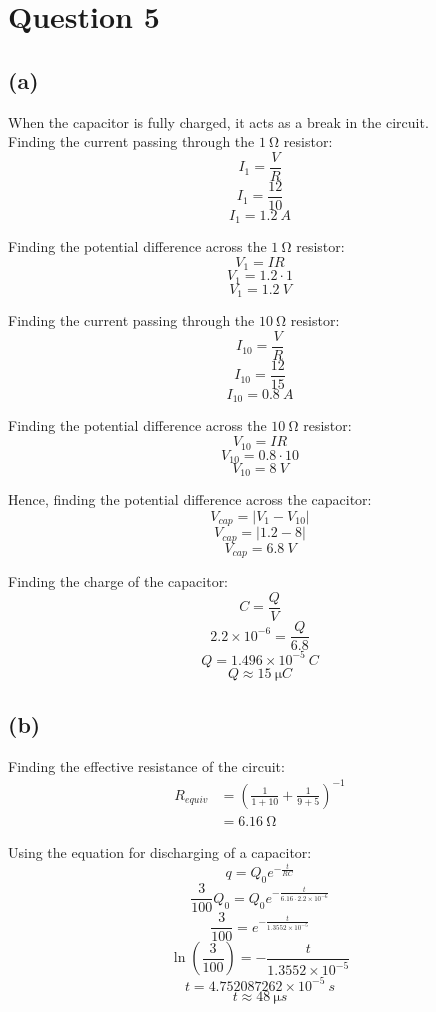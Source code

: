 \documentclass[11pt]{article}
\begin{document}
\section{Question 5}
\label{sec:org19bdea3}

\subsection{(a)}
\label{sec:org2affb1b}
When the capacitor is fully charged, it acts as a break in the circuit.
\\[0pt]

Finding the current passing through the \(\qty{1}{\unit{\ohm}}\) resistor:
\[I_1 = \frac{V}{R}\]
\[I_1 = \frac{12}{10}\]
\[I_1 = \qty{1.2}{\unit{A}}\]

Finding the potential difference across the \(\qty{1}{\unit{\ohm}}\) resistor:
\[V_1 = IR\]
\[V_1 = 1.2 \cdot 1\]
\[V_1 = \qty{1.2}{\unit{V}}\]

Finding the current passing through the \(\qty{10}{\unit{\ohm}}\) resistor:
\[I_{10} = \frac{V}{R}\]
\[I_{10} = \frac{12}{15}\]
\[I_{10} = \qty{0.8}{\unit{A}}\]

Finding the potential difference across the \(\qty{10}{\unit{\ohm}}\) resistor:
\[V_{10} = IR\]
\[V_{10} = 0.8 \cdot 10\]
\[V_{10} = \qty{8}{\unit{V}}\]

Hence, finding the potential difference across the capacitor:
\[V_{cap} = |V_1 - V_{10}|\]
\[V_{cap} = |1.2 - 8|\]
\[V_{cap} = \qty{6.8}{\unit{V}}\]

Finding the charge of the capacitor:
\[C = \frac{Q}{V}\]
\[2.2 \times 10^{-6} = \frac{Q}{6.8}\]
\[Q = 1.496 \times 10^{-5} \ \unit{C}\]
\[Q \approx \qty{15}{\unit{\micro C}}\]

\subsection{(b)}
\label{sec:orgdfb8208}
Finding the effective resistance of the circuit:
\begin{align*}
R_{equiv} &= \left( \frac{1}{1 + 10} + \frac{1}{9 + 5} \right)^{-1} \\
&= \qty{6.16}{\unit{\ohm}}
\end{align*}

Using the equation for discharging of a capacitor:
\[q = Q_0 e^{-\frac{t}{RC}}\]
\[\frac{3}{100} Q_0 = Q_0 e^{-\frac{t}{6.16 \cdot 2.2 \times 10^{-6}}}\]
\[\frac{3}{100} = e^{-\frac{t}{1.3552 \times 10^{-5}}}\]
\[\ln \left( \frac{3}{100} \right) = - \frac{t}{1.3552 \times 10^{-5}}\]
\[t = 4.752087262 \times 10^{-5} \ \unit{s}\]
\[t \approx \qty{48}{\unit{\micro s}}\]
\end{document}
